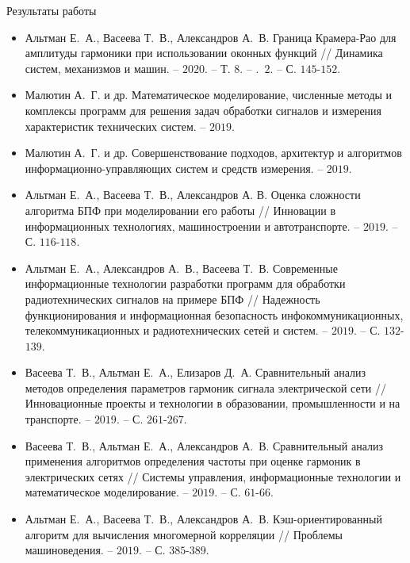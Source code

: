 \begin{frame}{Результаты работы}
\scriptsize{
\begin{itemize}
	\item Альтман Е.~А., Васеева Т.~В., Александров А.~В. Граница Крамера-Рао для амплитуды гармоники при использовании оконных функций // Динамика систем, механизмов и машин. – $2020$. – Т. $8$. – \textnumero.~$2$. – С. $145$-$152$.
	
	\item Малютин А.~Г. и др. Математическое моделирование, численные методы и комплексы программ для решения задач обработки сигналов и измерения характеристик технических систем. – $2019$.
	
	\item  Малютин А.~Г. и др. Совершенствование подходов, архитектур и алгоритмов информационно-управляющих систем и средств измерения. – $2019$.
		
	\item Альтман Е.~А., Васеева Т.~В., Александров А. В. Оценка сложности алгоритма БПФ при моделировании его работы // Инновации в информационных технологиях, машиностроении и автотранспорте. – $2019$. – С. $116$-$118$.
	
	
	\item Альтман Е.~А., Александров А.~В., Васеева Т.~В. Современные информационные технологии разработки программ для обработки радиотехнических сигналов на примере БПФ // Надежность функционирования и информационная безопасность инфокоммуникационных, телекоммуникационных и радиотехнических сетей и систем. – $2019$. – С. $132$-$139$.
	
	\item Васеева Т.~В., Альтман Е.~А., Елизаров Д.~А. Сравнительный анализ методов определения параметров гармоник сигнала электрической сети // Инновационные проекты и технологии в образовании, промышленности и на транспорте. – $2019$. – С. $261$-$267$.

	\item Васеева Т.~В., Альтман Е.~А., Александров А.~В. Сравнительный анализ применения алгоритмов определения частоты при оценке гармоник в электрических сетях // Системы управления, информационные технологии и математическое моделирование. – $2019$. – С. $61$-$66$.

	\item Альтман Е.~А., Васеева Т.~В., Александров А.~В. Кэш-ориентированный алгоритм для вычисления многомерной корреляции // Проблемы машиноведения. – $2019$. – С. $385$-$389$.
\end{itemize}}
\end{frame}

